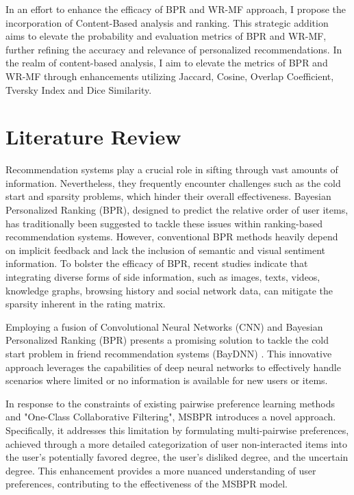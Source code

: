 \documentclass[journal]{IEEEtran}
\begin{document}
In an effort to enhance the efficacy of BPR and WR-MF approach, I propose the incorporation of Content-Based analysis and ranking. 
This strategic addition aims to elevate the probability and evaluation metrics of BPR and WR-MF, further refining the accuracy and 
relevance of personalized recommendations. In the realm of content-based analysis, I aim to elevate the metrics of BPR and WR-MF 
through enhancements utilizing Jaccard, Cosine, Overlap Coefficient, Tversky Index and Dice Similarity. 

\section{Literature Review}

Recommendation systems play a crucial role in sifting through vast amounts of information. Nevertheless, they frequently encounter 
challenges such as the cold start and sparsity problems, which hinder their overall effectiveness. Bayesian Personalized Ranking (BPR), 
designed to predict the relative order of user items, has traditionally been suggested to tackle these issues within ranking-based 
recommendation systems. However, conventional BPR methods heavily depend on implicit feedback and lack the inclusion of semantic 
and visual sentiment information. To bolster the efficacy of BPR, recent studies indicate that 
integrating diverse forms of side information, such as images, texts, videos, knowledge graphs, browsing history 
\cite{10.1145/3132847.3132941}\cite{8689028} and social network data, \cite{WU2024121930} can mitigate the sparsity inherent in the rating matrix. 

Employing a fusion of Convolutional Neural Networks (CNN) and Bayesian Personalized Ranking (BPR) presents a promising solution 
to tackle the cold start problem in friend recommendation systems (BayDNN) \cite{10.1145/3132847.3132941}. This innovative 
approach leverages the capabilities of deep neural networks to effectively handle scenarios where limited or no information is 
available for new users or items.

In response to the constraints of existing pairwise preference learning methods and "One-Class Collaborative Filtering", 
MSBPR \cite{ZENG2023110165} introduces a 
novel approach. Specifically, it addresses this limitation by formulating multi-pairwise preferences, achieved through a 
more detailed categorization of user non-interacted items into the user's potentially favored degree, the user's disliked 
degree, and the uncertain degree. This enhancement provides a more nuanced understanding of user preferences, contributing 
to the effectiveness of the MSBPR model.
\end{document}
